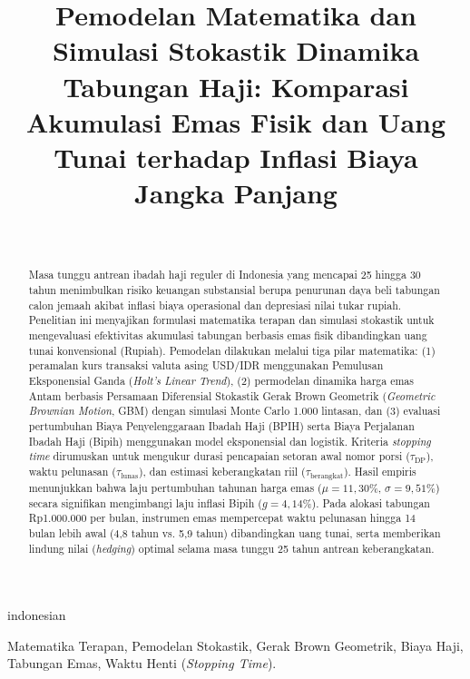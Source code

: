 \documentclass[journal,twoside]{IEEEtran}
\begin{document}
\title{Pemodelan Matematika dan Simulasi Stokastik Dinamika Tabungan Haji: Komparasi Akumulasi Emas Fisik dan Uang Tunai terhadap Inflasi Biaya Jangka Panjang}

\author{
    \\
}

\maketitle

\begin{selectlanguage}{indonesian}
\begin{abstract}
Masa tunggu antrean ibadah haji reguler di Indonesia yang mencapai 25 hingga 30 tahun menimbulkan risiko keuangan substansial berupa penurunan daya beli tabungan calon jemaah akibat inflasi biaya operasional dan depresiasi nilai tukar rupiah. Penelitian ini menyajikan formulasi matematika terapan dan simulasi stokastik untuk mengevaluasi efektivitas akumulasi tabungan berbasis emas fisik dibandingkan uang tunai konvensional (Rupiah). Pemodelan dilakukan melalui tiga pilar matematika: (1) peramalan kurs transaksi valuta asing USD/IDR menggunakan Pemulusan Eksponensial Ganda (\textit{Holt's Linear Trend}), (2) permodelan dinamika harga emas Antam berbasis Persamaan Diferensial Stokastik Gerak Brown Geometrik (\textit{Geometric Brownian Motion}, GBM) dengan simulasi Monte Carlo 1.000 lintasan, dan (3) evaluasi pertumbuhan Biaya Penyelenggaraan Ibadah Haji (BPIH) serta Biaya Perjalanan Ibadah Haji (Bipih) menggunakan model eksponensial dan logistik. Kriteria \textit{stopping time} dirumuskan untuk mengukur durasi pencapaian setoran awal nomor porsi ($\tau_{\text{DP}}$), waktu pelunasan ($\tau_{\text{lunas}}$), dan estimasi keberangkatan riil ($\tau_{\text{berangkat}}$). Hasil empiris menunjukkan bahwa laju pertumbuhan tahunan harga emas ($\mu = 11{,}30\%$, $\sigma = 9{,}51\%$) secara signifikan mengimbangi laju inflasi Bipih ($g = 4{,}14\%$). Pada alokasi tabungan Rp1.000.000 per bulan, instrumen emas mempercepat waktu pelunasan hingga 14 bulan lebih awal (4,8 tahun vs. 5,9 tahun) dibandingkan uang tunai, serta memberikan lindung nilai (\textit{hedging}) optimal selama masa tunggu 25 tahun antrean keberangkatan.
\end{abstract}

\begin{IEEEkeywords}
Matematika Terapan, Pemodelan Stokastik, Gerak Brown Geometrik, Biaya Haji, Tabungan Emas, Waktu Henti (\textit{Stopping Time}).
\end{IEEEkeywords}
\end{selectlanguage}
\end{document}
